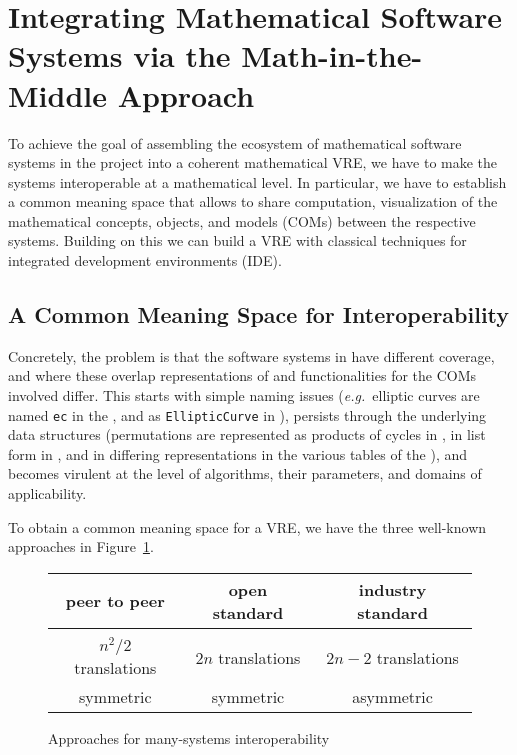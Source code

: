 \section{Integrating Mathematical Software Systems via the Math-in-the-Middle Approach}\label{sec:mitm}



To achieve the goal of assembling the ecosystem of mathematical software systems in the
\ODK project into a coherent mathematical VRE, we have to make the systems interoperable at
a mathematical level. In particular, we have to establish a common meaning space that
allows to share computation, visualization of the mathematical concepts, objects, and
models (COMs) between the respective systems. Building on this we can build a VRE with
classical techniques for integrated development environments (IDE).

\subsection{A Common Meaning Space for Interoperability}

Concretely, the problem is that the software systems in \ODK have different coverage, and
where these overlap representations of and functionalities for the COMs involved differ.
This starts with simple naming issues (\emph{e.g.}\ elliptic curves are named
\lstinline|ec| in the \LMFDB, and as \lstinline|EllipticCurve| in \Sage), persists through
the underlying data structures (permutations are represented as products of cycles in
\GAP, in list form in \Sage, and in differing representations in the various tables of the
\LMFDB), and becomes virulent at the level of algorithms, their parameters, and domains of
applicability.

To obtain a common meaning space for a VRE, we have the three well-known approaches in
Figure~\ref{fig:interop}.
\begin{figure}[ht]\centering
  \begin{tabular}{|c|c|c|}\hline
    peer to peer & open standard & industry standard\\\hline
     &  & \\\hline
    $n^2/2$  translations & $2n$ translations & $2n-2$ translations \\
    symmetric & symmetric & asymmetric\\\hline
  \end{tabular}
  \caption{Approaches for many-systems interoperability}\label{fig:interop}
\end{figure}

